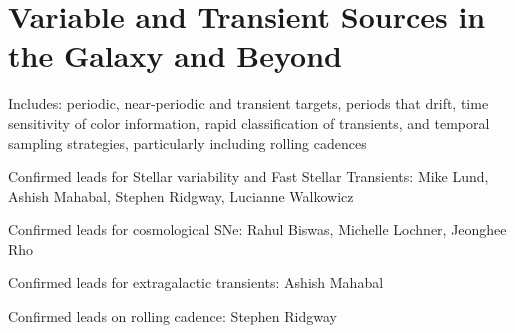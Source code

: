 \chapter[Variables and Transients]{Variable and Transient Sources in the Galaxy and Beyond}

Includes: periodic, near-periodic and transient targets, periods that
drift, time sensitivity of color information, rapid classification of
transients, and temporal sampling strategies, particularly including
rolling cadences

Confirmed leads for Stellar variability and Fast Stellar Transients:
Mike Lund, Ashish Mahabal, Stephen Ridgway, Lucianne Walkowicz

Confirmed leads for cosmological SNe: Rahul Biswas, Michelle Lochner,
Jeonghee Rho

Confirmed leads for extragalactic transients: Ashish Mahabal

Confirmed leads on rolling cadence: Stephen Ridgway

